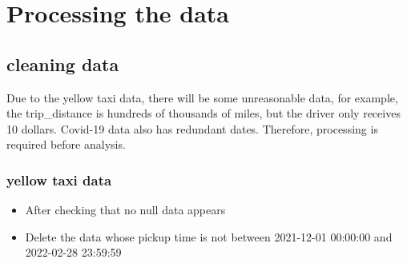 \documentclass[11pt]{article}
\begin{document}
\section{Processing the data}
\subsection{cleaning data}
Due to the yellow taxi data, there will be some unreasonable data, for example, the trip\_distance is hundreds of thousands of miles, but the driver only receives 10 dollars. Covid-19 data also has redundant dates. Therefore, processing is required before analysis.
\subsubsection{yellow taxi data}
\begin{itemize}
    \item After checking that no null data appears
\end{itemize}
\begin{itemize}
    \item Delete the data whose pickup time is not between 2021-12-01 00:00:00 and 2022-02-28 23:59:59
\end{itemize}
\end{document}
